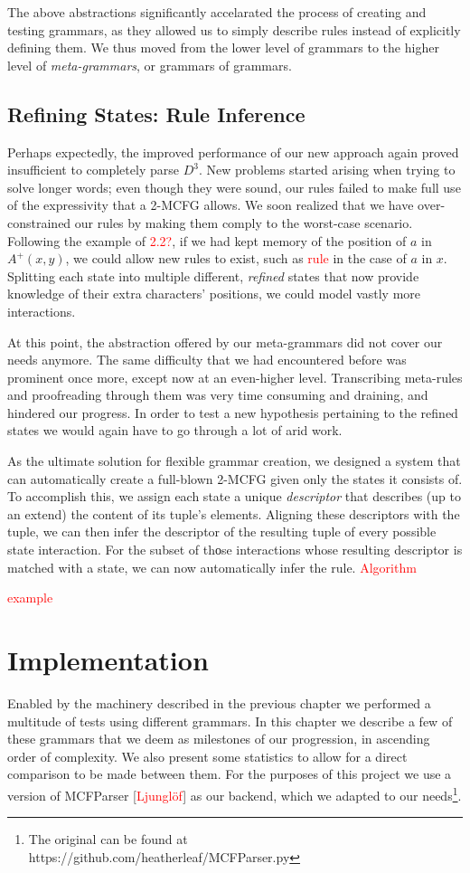 \documentclass[nonatbib,numbers,10pt]{sigplanconf}
\newcommand\todo[1]{\textcolor{red}{#1}}
\begin{document}
The above abstractions significantly accelarated the process of creating and testing grammars, as they allowed us to simply describe rules instead of explicitly defining them. We thus moved from the lower level of grammars to the higher level of \textit{meta-grammars}, or grammars of grammars.

\subsection{Refining States: Rule Inference}
Perhaps expectedly, the improved performance of our new approach again proved insufficient to completely parse $D^3$. New problems started arising when trying to solve longer words; even though they were sound, our rules failed to make full use of the expressivity that a 2-MCFG allows. We soon realized that we have over-constrained our rules by making them comply to the worst-case scenario. Following the example of \todo{2.2?}, if we had kept memory of the position of $a$ in $A^{+}(x,y)$, we could allow new rules to exist, such as \todo{rule} in the case of $a$ in $x$. Splitting each state into multiple different, \textit{refined} states that now provide knowledge of their extra characters' positions, we could model vastly more interactions.

At this point, the abstraction offered by our meta-grammars did not cover our needs anymore. The same difficulty that we had encountered before was prominent once more, except now at an even-higher level. Transcribing meta-rules and proofreading through them was very time consuming and draining, and hindered our progress. In order to test a new hypothesis pertaining to the refined states we would again have to go through a lot of arid work.

As the ultimate solution for flexible grammar creation, we designed a system that can automatically create a full-blown 2-MCFG given only the states it consists of. To accomplish this, we assign each state a unique \textit{descriptor} that describes (up to an extend) the content of its tuple's elements. Aligning these descriptors with the tuple, we can then infer the descriptor of the resulting tuple of every possible state interaction. For the subset of thοse interactions whose resulting descriptor is matched with a state, we can now automatically infer the rule.
\todo{Algorithm}

\todo{example}

\section{Implementation}
Enabled by the machinery described in the previous chapter we performed a multitude of tests using different grammars. In this chapter we describe a few of these grammars that we deem as milestones of our progression, in ascending order of complexity. We also present some statistics to allow for a direct comparison to be made between them. For the purposes of this project we use a version of MCFParser [\todo{Ljunglöf}] as our backend, which we adapted to our needs\footnote{The original can be found at https://github.com/heatherleaf/MCFParser.py}.
\end{document}
